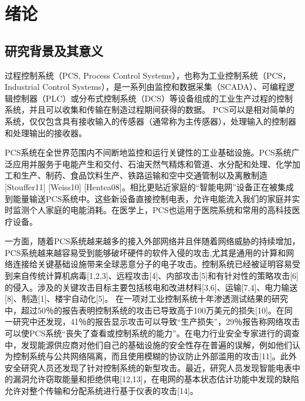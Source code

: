 

\chapter{绪论}
\label{chap:intro}



\section{研究背景及其意义}

过程控制系统（PCS, Process Control Systems），也称为工业控制系统（PCS，Industrial Control Systems），是一系列由监控和数据采集（SCADA）、可编程逻辑控制器（PLC）或分布式控制系统（DCS）等设备组成的工业生产过程的控制系统，并且可以收集和传输在制造过程期间获得的数据。 PCS可以是相对简单的系统，仅仅包含具有接收输入的传感器（通常称为主传感器），处理输入的控制器和处理输出的接收器。

PCS系统在全世界范围内不间断地监控和运行关键性的工业基础设施。PCS系统广泛应用并服务于电能产生和交付、石油天然气精炼和管道、水分配和处理、化学加工和生产、制药、食品饮料生产、铁路运输和空中交通管制以及离散制造[Stouffer11] [Weiss10] [Hentea08]。相比更贴近家庭的“智能电网”设备正在被集成到能量输送PCS系统中。这些新设备直接控制电表，允许电能流入我们的家庭并实时监测个人家庭的电能消耗。在医学上，PCS也运用于医院系统和常用的高科技医疗设备。

一方面，随着PCS系统越来越多的接入外部网络并且伴随着网络威胁的持续增加，PCS系统越来越容易受到能够破坏硬件的软件入侵的攻击,尤其是通用的计算和网络连接给关键基础设施带来全球恶意分子的电子攻击。控制系统已经被证明容易受到来自传统计算机病毒[1,2,3]、远程攻击[4]、内部攻击[5]和有针对性的策略攻击[6]的侵入。涉及的关键攻击目标主要包括核电和改进材料[3,6]、运输[7,4]、电力输送[8]、制造[1]、楼宇自动化[5]。
在一项对工业控制系统十年渗透测试结果的研究中，超过50％的报告表明控制系统的攻击已导致高于100万美元的损失[10]。在同一研究中还发现，41％的报告显示攻击可以导致“生产损失”，29％报告称网络攻击可以使PCS系统“丧失了查看或控制系统的能力”。在电力行业安全专家进行的调查中，发现能源供应商对他们自己的基础设施的安全性存在普遍的误解，例如他们认为控制系统与公共网络隔离，而且使用模糊的协议防止外部滥用的攻击[11]。此外安全研究人员还发现了针对控制系统的新型攻击。最近，研究人员发现智能电表中的漏洞允许窃取能量和拒绝供电[12,13]，在电网的基本状态估计功能中发现的缺陷允许对整个传输和分配系统进行基于仪表的攻击[14]。

